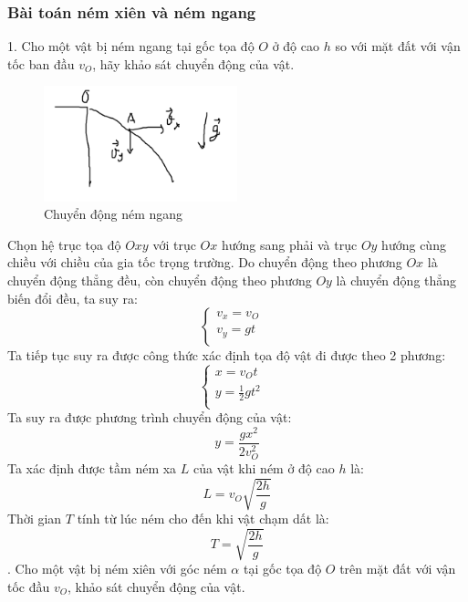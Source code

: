 \subsubsection{Bài toán ném xiên và ném ngang}
1. Cho một vật bị ném ngang tại gốc tọa độ $O$ ở độ cao $h$ so với mặt đất với vận tốc ban đầu $v_{O}$, hãy khảo sát chuyển động của vật.\\
\begin{figure}
    \centering
    \includegraphics[width=0.5\textwidth]{nem_ngang.png}
    \caption{Chuyển động ném ngang}
    \label{nem_ngang}
    \end{figure}
Chọn hệ trục tọa độ $Oxy$ với trục $Ox$ hướng sang phải và trục $Oy$ hướng cùng chiều với chiều của gia tốc trọng trường.
Do chuyển động theo phương $Ox$ là chuyển động thẳng đều, còn chuyển động theo phương $Oy$ là chuyển động thẳng biến đổi đều, ta suy ra:
    $$\left\{\begin{array}{ll}
    v_{x}=v_{O} &\\
    v_{y}=gt &\\
    \end{array}\right.$$
Ta tiếp tục suy ra được công thức xác định tọa độ vật đi được theo 2 phương:
$$\left\{\begin{array}{ll}
    x=v_{O}t&\\
    y=\frac{1}{2}gt^2 &\\
\end{array}\right.$$
Ta suy ra được phương trình chuyển động của vật:
\begin{equation}
    y=\frac{gx^2}{2v_{O}^2}
\end{equation}
Ta xác định được tầm ném xa $L$ của vật khi ném ở độ cao $h$ là:
\begin{equation}
    L=v_{O}\sqrt{\frac{2h}{g}}
\end{equation}
Thời gian $T$ tính từ lúc ném cho đến khi vật chạm dất là:
\begin{equation}
    T=\sqrt{\frac{2h}{g}}
\end{equation}
. Cho một vật bị ném xiên với góc ném $\alpha$ tại gốc tọa độ $O$ trên mặt đất với vận tốc đầu $v_{O}$, khảo sát chuyển động của vật.\\
